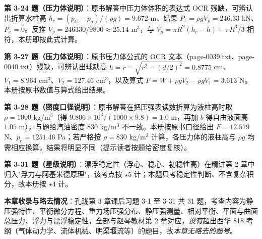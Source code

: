 \begin{tishi}
\textbf{第 3-24 题（压力体说明）}：原书解答中压力体体积的表达式 OCR 残缺，可辨认出折算水柱高 $h_c=(p_C-p_a)/(\rho g)=9.672$ m、结果 $P_z=\rho gV_p=246.33$ kN、$P_x=0$。反推 $V_p=246330/9800\approx25.14$ m$^3$，与 $V_p=\pi R^2(h_c-h)+\pi R^3/3$ 相符，本册即按此式计算。
\end{tishi}

\begin{tishi}
\textbf{第 3-27 题（压力体说明）}：原书压力体公式的 OCR 文本（page-0039.txt、page-0040.txt）残缺，可辨认出球缺高 $h=r-\sqrt{r^2-(d/2)^2}=0.8775$ cm、$V_1=8.964$ cm$^3$、$V_2=127.46$ cm$^3$，以及算式 $F=W+\rho gV_2-\rho gV_1=3.613$ N。本册按原书数值与算式给出结果。
\end{tishi}

\begin{tishi}
\textbf{第 3-28 题（密度口径说明）}：原书解答在把压强表读数折算为液柱高时取 $\rho=1000$ kg/m$^3$（得 $9.806\times10^3/(1000\times9.8)=1.0$ m，再加 $b$ 得自由液面高 $1.05$ m），与题给汽油密度 $830$ kg/m$^3$ 不一致。本册按原书口径给出 $F=12.579$ N、$p_e=1251.46$ Pa；若严格按 $\rho=830$ kg/m$^3$ 计算，各压力体的液柱高与 $\rho g$ 均需相应换算，结果将明显不同（提示读者按题给密度复核）。
\end{tishi}

\begin{tishi}
\textbf{第 3-31 题（星级说明）}：漂浮稳定性（浮心、稳心、初稳性高）在精讲第 2 章中归入"浮力与阿基米德原理"，该考点按 $\star$5 计；本题只考稳定性判断、不含复杂积分，故本册按 $\star$4 计。
\end{tishi}

\begin{tishi}
\textbf{本章收录与略去情况}：孔珑第 3 章课后习题 3-1 至 3-31 共 31 题，考查内容为静压强特性、平衡微分方程、重力场压强分布、静压强测量、相对平衡、平面与曲面总压力、浮力与漂浮稳定性，全部与赵琴教材第 2 章对应，\emph{没有}超出西华 818 考纲（气体动力学、流体机械、明渠堰流等）的题目，故\emph{本章无略去的题号}。
\end{tishi}

